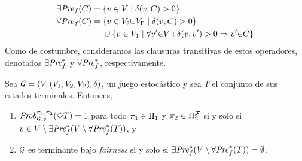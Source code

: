 %
\begin{align*}
  \exists\mathit{Pre}_f(C) = {}&\{ v \in V \mid \delta(v,C) > 0\} \\
  \forall\mathit{Pre}_f(C) = {}&\{ v \in V_2{\cup} V_{\mathsf{P}} \mid \delta(v,C)>0\} \\ 
                       &\cup \{ v \in  V_1 \mid \forall v' {\in} V : \delta(v,v') > 0 \Rightarrow v' {\in} C \}
\end{align*}
Como de costumbre, consideramos las clausuras transitivas de estos operadores, denotados $\exists\mathit{Pre}_f^*$ y $\forall\mathit{Pre}_f^*$, respectivamente.
%
\begin{theorem}\label{thm:stopping-algorithm}
  Sea $\mathcal{G} = (V, (V_1, V_2, V_{\mathsf{P}}), \delta)$, un juego estocástico y sea $T$ el conjunto de sus estados terminales. Entonces,
  \begin{enumerate}[(1)]
  \item%
    $\mathit{Prob}^{\pi_{1}, \pi_{2}}_{\mathcal{G},v}(\Diamond T) = 1$ para todo
    $\pi_{1} \in \Pi_{1}$ y $\pi_{2} \in \Pi^{\mathcal{F}}_{2}$
    si y solo si $v \in V\setminus \exists\mathit{Pre}_f^*(V \setminus \forall\mathit{Pre}_f^*(T))$, y
  \item%
    $\mathcal{G}$ es terminante bajo \textit{fairness} si y solo si
    $\exists\mathit{Pre}_f^*(V \setminus \forall\mathit{Pre}_f^*(T)) = \emptyset$.
  \end{enumerate}
\end{theorem}

